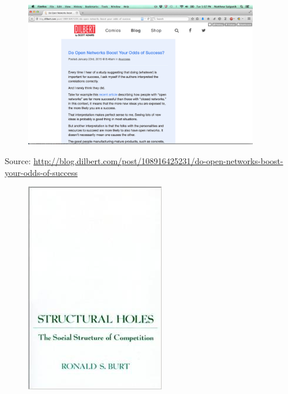\documentclass{beamer}
\begin{document}
\begin{frame}

\begin{figure}
  \centering
  \includegraphics[width=0.9\textwidth]{figures/adams_do_2015}
\end{figure}

\tiny{Source: \url{http://blog.dilbert.com/post/108916425231/do-open-networks-boost-your-odds-of-success}}


\end{frame}
\begin{frame}

\begin{figure}
  \centering
  \includegraphics[height=0.8\textheight]{figures/burt_structural_1995}
\end{figure}


\end{frame}
\end{document}
